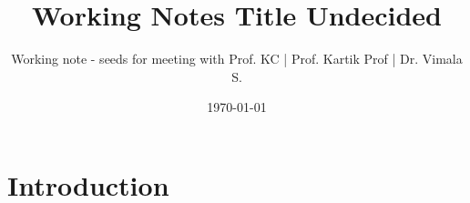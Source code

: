 \documentclass[11pt]{article}
\title{Working Notes Title Undecided}
\author{Working note -  seeds for meeting with Prof. KC | Prof. Kartik Prof | Dr. Vimala S.}
\date{\today}
\begin{document}
\maketitle

\begin{abstract}

\end{abstract}

\section{Introduction}
\end{document}

